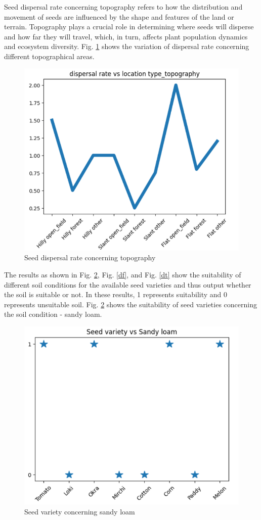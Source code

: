 \documentclass[conference]{IEEEtran}
\begin{document}
Seed dispersal rate concerning topography refers to how the distribution and movement of seeds are influenced by the shape and features of the land or terrain. Topography plays a crucial role in determining where seeds will disperse and how far they will travel, which, in turn, affects plant population dynamics and ecosystem diversity. Fig. \ref{ds} shows the variation of dispersal rate concerning different topographical areas.
\begin{figure}[htp]
    \centering
    \includegraphics[scale=0.5]{plot11.png}
    \caption{Seed dispersal rate concerning topography}
    \label{ds}
\end{figure}
The results as shown in Fig. \ref{de}, Fig. \ref{df}, and Fig. \ref{dt} show the suitability of different soil conditions for the available seed varieties and thus output whether the soil is suitable or not. In these results, 1 represents suitability and 0 represents unsuitable soil.
Fig. \ref{de} shows the suitability of seed varieties concerning the soil condition - sandy loam.
\begin{figure}[htp]
    \centering
    \includegraphics[scale=0.5]{plot12.png}
    \caption{Seed variety concerning sandy loam}
    \label{de}
\end{figure}
\end{document}
